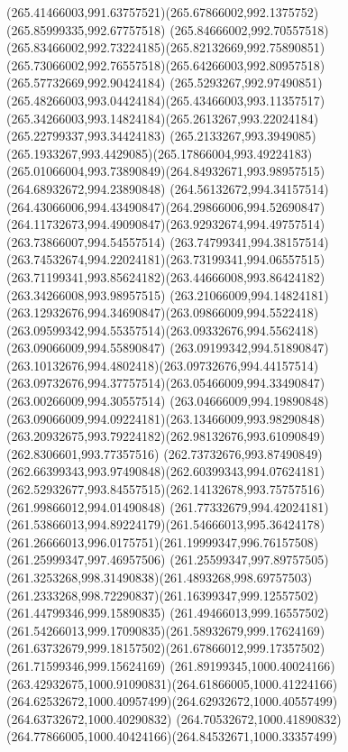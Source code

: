 {    \curveto(265.41466003,991.63757521)(265.67866002,992.1375752)(265.85999335,992.67757518)
    \curveto(265.84666002,992.70557518)(265.83466002,992.73224185)(265.82132669,992.75890851)
    \curveto(265.73066002,992.76557518)(265.64266003,992.80957518)(265.57732669,992.90424184)
    \curveto(265.5293267,992.97490851)(265.48266003,993.04424184)(265.43466003,993.11357517)
    \curveto(265.34266003,993.14824184)(265.2613267,993.22024184)(265.22799337,993.34424183)
    \curveto(265.2133267,993.3949085)(265.1933267,993.4429085)(265.17866004,993.49224183)
    \curveto(265.01066004,993.73890849)(264.84932671,993.98957515)(264.68932672,994.23890848)
    \curveto(264.56132672,994.34157514)(264.43066006,994.43490847)(264.29866006,994.52690847)
    \curveto(264.11732673,994.49090847)(263.92932674,994.49757514)(263.73866007,994.54557514)
    \curveto(263.74799341,994.38157514)(263.74532674,994.22024181)(263.73199341,994.06557515)
    \curveto(263.71199341,993.85624182)(263.44666008,993.86424182)(263.34266008,993.98957515)
    \curveto(263.21066009,994.14824181)(263.12932676,994.34690847)(263.09866009,994.5522418)
    \curveto(263.09599342,994.55357514)(263.09332676,994.5562418)(263.09066009,994.55890847)
    \curveto(263.09199342,994.51890847)(263.10132676,994.4802418)(263.09732676,994.44157514)
    \curveto(263.09732676,994.37757514)(263.05466009,994.33490847)(263.00266009,994.30557514)
    \curveto(263.04666009,994.19890848)(263.09066009,994.09224181)(263.13466009,993.98290848)
    \curveto(263.20932675,993.79224182)(262.98132676,993.61090849)(262.8306601,993.77357516)
    \curveto(262.73732676,993.87490849)(262.66399343,993.97490848)(262.60399343,994.07624181)
    \curveto(262.52932677,993.84557515)(262.14132678,993.75757516)(261.99866012,994.01490848)
    \curveto(261.77332679,994.42024181)(261.53866013,994.89224179)(261.54666013,995.36424178)
    \curveto(261.26666013,996.0175751)(261.19999347,996.76157508)(261.25999347,997.46957506)
    \curveto(261.25599347,997.89757505)(261.3253268,998.31490838)(261.4893268,998.69757503)
    \curveto(261.2333268,998.72290837)(261.16399347,999.12557502)(261.44799346,999.15890835)
    \curveto(261.49466013,999.16557502)(261.54266013,999.17090835)(261.58932679,999.17624169)
    \curveto(261.63732679,999.18157502)(261.67866012,999.17357502)(261.71599346,999.15624169)
    \curveto(261.89199345,1000.40024166)(263.42932675,1000.91090831)(264.61866005,1000.41224166)
    \curveto(264.62532672,1000.40957499)(264.62932672,1000.40557499)(264.63732672,1000.40290832)
    \curveto(264.70532672,1000.41890832)(264.77866005,1000.40424166)(264.84532671,1000.33357499)
}
